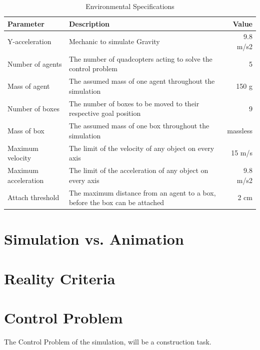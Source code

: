 \begin{table}[]
\centering
\label{sim:env_specs}
\begin{tabularx}{1\textwidth}{l@{}Xr}
\toprule
\textbf{Parameter}   & \textbf{Description}                                                        & \textbf{Value} \\ \midrule
Y-acceleration       & Mechanic to simulate Gravity                                                & 9.8 m/s2       \\
Number of agents     & The number of quadcopters acting to solve the control problem               & 5              \\
Mass of agent        & The assumed mass of one agent throughout the simulation                     & 150 g          \\
Number of boxes      & The number of boxes to be moved to their respective goal position           & 9              \\
Mass of box          & The assumed mass of one box throughout the simulation                       & massless       \\
Maximum velocity     & The limit of the velocity of any object on every axis                       & 15 m/s         \\
Maximum acceleration & The limit of the acceleration of any object on every axis                   & 9.8 m/s2       \\
Attach threshold     & The maximum distance from an agent to a box, before the box can be attached & 2 cm           \\ \bottomrule
\end{tabularx}
\caption{Environmental Specifications}
\end{table}
\section{Simulation vs. Animation}
\label{sec:simulation_animation}


\section{Reality Criteria}
\label{sec:reality}

\section{Control Problem}
\label{sec:control_problem}
The Control Problem of the simulation, will be a construction task. 

